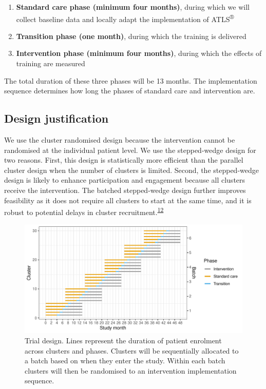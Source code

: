 \documentclass[
  11pt,
]{article}
\providecommand{\tightlist}{%
  \setlength{\itemsep}{0pt}\setlength{\parskip}{0pt}}
\begin{document}
\begin{enumerate}
\def\labelenumi{\arabic{enumi}.}
\tightlist
\item
  \textbf{Standard care phase (minimum four months)}, during which we will collect baseline data and locally adapt the implementation of ATLS\textsuperscript{®}
\item
  \textbf{Transition phase (one month)}, during which the training is delivered
\item
  \textbf{Intervention phase (minimum four months)}, during which the effects of training are measured
\end{enumerate}

The total duration of these three phases will be 13 months. The implementation sequence determines how long the phases of standard care and intervention are.

\hypertarget{design-justification}{%
\subsection{Design justification}\label{design-justification}}

We use the cluster randomised design because the intervention cannot be randomised at the individual patient level. We use the stepped-wedge design for two reasons. First, this design is statistically more efficient than the parallel cluster design when the number of clusters is limited. Second, the stepped-wedge design is likely to enhance participation and engagement because all clusters receive the intervention. The batched stepped-wedge design further improves feasibility as it does not require all clusters to start at the same time, and it is robust to potential delays in cluster recruitment.\textsuperscript{\protect\hyperlink{ref-Kasza2022}{12}}

\begin{figure}
\includegraphics{trial-design-figure-30-clusters-5-sequences-6-batches-6-batches-overlap-4-min-standard-care-4-min-intervention-1-transition-months-0-transition-overlap} \caption{Trial design. Lines represent the duration of patient enrolment across clusters and phases. Clusters will be sequentially allocated to a batch based on when they enter the study. Within each batch clusters will then be randomised to an intervention implementation sequence.}\label{fig:trial-design}
\end{figure}
\end{document}

